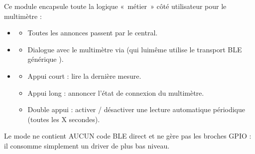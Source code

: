 \documentclass[letterpaper,10pt,french]{sphinxmanual}
\begin{document}
\sphinxAtStartPar
Ce module encapsule toute la logique « métier » côté utilisateur pour le multimètre :
\begin{itemize}
\item {} \begin{description}
\begin{itemize}
\item {} 
\sphinxAtStartPar
Toutes les annonces passent par le  central.

\end{itemize}

\end{description}

\item {} \begin{description}
\begin{itemize}
\item {} 
\sphinxAtStartPar
Dialogue avec le multimètre via 
(qui lui\sphinxhyphen{}même utilise le transport BLE générique ).

\end{itemize}

\end{description}

\item {} \begin{description}
\begin{itemize}
\item {} 
\sphinxAtStartPar
Appui court  : lire la dernière mesure.

\item {} 
\sphinxAtStartPar
Appui long   : annoncer l’état de connexion du multimètre.

\item {} 
\sphinxAtStartPar
Double appui : activer / désactiver une lecture automatique périodique
(toutes les X secondes).

\end{itemize}

\end{description}

\end{itemize}

\sphinxAtStartPar
Le mode ne contient AUCUN code BLE direct et ne gère pas les broches GPIO :
il consomme simplement un driver de plus bas niveau.
\end{document}
